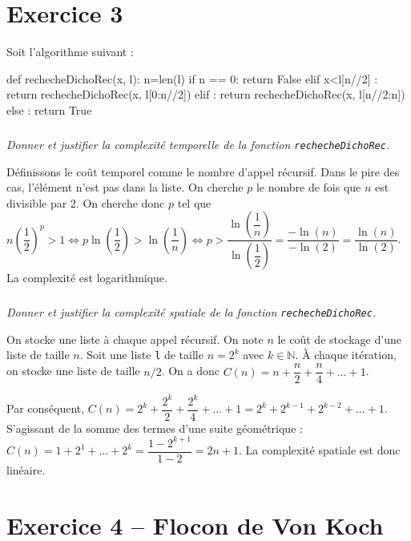 \section*{Exercice 3}
\setcounter{subparagraph}{0}

Soit l'algorithme suivant : 

\begin{py}
\begin{python}
def rechecheDichoRec(x, l):
    n=len(l)
    if n == 0:
        return False
    elif x<l[n//2] :
        return rechecheDichoRec(x, l[0:n//2])
    elif :
        return rechecheDichoRec(x, l[n//2:n])
    else :
        return True
\end{python}
\end{py}

\subparagraph{}
\textit{Donner et justifier la complexité temporelle de la fonction \texttt{rechecheDichoRec}.}
\ifprof
\begin{corrige}
Définissons le coût temporel comme le nombre d'appel récursif. Dans le pire des cas, l'élément n'est pas dans la liste. 
 On cherche $p$ le nombre de fois que $n$ est divisible par 2. On cherche donc $p$ tel que 
$n\left(\dfrac{1}{2}\right)^p>1 \Leftrightarrow p\ln \left(\dfrac{1}{2}\right)>\ln\left(\dfrac{1}{n}\right) 
\Leftrightarrow  p>\dfrac{\ln\left(\dfrac{1}{n}\right)}{\ln\left(\dfrac{1}{2}\right)} 
=\dfrac{-\ln\left(n\right)}{-\ln\left(2 \right)}   =\dfrac{\ln\left(n\right)}{\ln\left(2 \right)}$. La complexité est 
logarithmique. 
\end{corrige}
\else
\fi

\subparagraph{}
\textit{Donner et justifier la complexité spatiale de la fonction \texttt{rechecheDichoRec}.}
\ifprof
\begin{corrige}
On stocke une liste à chaque appel récursif. On note $n$ le coût de stockage d'une liste de taille $n$. Soit une liste 
\texttt{l} de taille $n=2^k$ avec $k\in \mathbb{N}$. 
À chaque itération, on stocke une liste de taille $n/2$.
On a donc $C(n)=n+\dfrac{n}{2}+\dfrac{n}{4}+...+1$. 

Par conséquent, $C(n)=2^k+\dfrac{2^k}{2}+\dfrac{2^k}{4}+...+1=2^k+2^{k-1}+2^{k-2}+...+1$. S'agissant de la somme des 
termes d'une suite géométrique :
$C(n)=1+2^1+...+2^k =\dfrac{1-2^{k+1}}{1-2} =2n+1$. La complexité spatiale est donc linéaire. 
\end{corrige}
\else
\fi


\section*{Exercice 4 -- Flocon de Von Koch}
\setcounter{subparagraph}{0}


